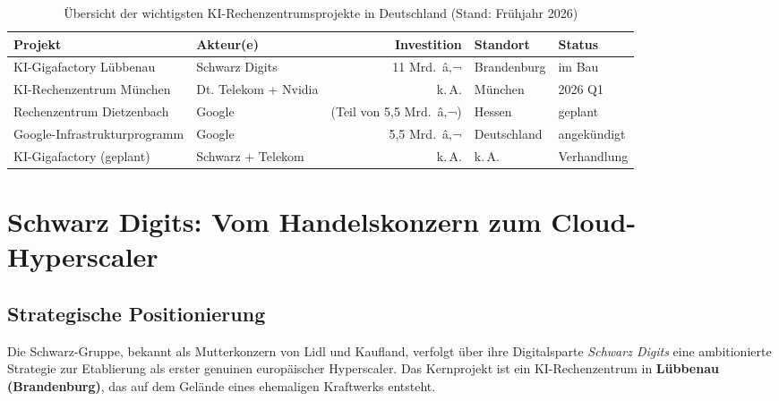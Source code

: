 ﻿\documentclass[12pt, a4paper, openany]{report}
\begin{document}
\begin{table}
	\centering
	\caption{Übersicht der wichtigsten KI-Rechenzentrumsprojekte in Deutschland (Stand: Frühjahr 2026)}
	\label{tab:rechenzentren_projekte}
	\begin{tabularx}{\textwidth}{l l r l l}
		\toprule
		\textbf{Projekt} & \textbf{Akteur(e)} & \textbf{Investition} & \textbf{Standort} & \textbf{Status} \\
		\midrule
		KI-Gigafactory Lübbenau & Schwarz Digits & 11 Mrd.\ â‚¬ & Brandenburg & im Bau \\
		KI-Rechenzentrum München & Dt. Telekom + Nvidia & k.\,A. & München & 2026 Q1 \\
		Rechenzentrum Dietzenbach & Google & (Teil von 5,5 Mrd.\ â‚¬) & Hessen & geplant \\
		Google-Infrastrukturprogramm & Google & 5,5 Mrd.\ â‚¬ & Deutschland & angekündigt \\
		KI-Gigafactory (geplant) & Schwarz + Telekom & k.\,A. & k.\,A. & Verhandlung \\
		\bottomrule
	\end{tabularx}
\end{table}

\section{Schwarz Digits: Vom Handelskonzern zum Cloud-Hyperscaler}
\label{sec:schwarz_digits}

\subsection{Strategische Positionierung}

Die Schwarz-Gruppe, bekannt als Mutterkonzern von Lidl und Kaufland, verfolgt
über ihre Digitalsparte \textit{Schwarz Digits} eine ambitionierte Strategie
zur Etablierung als erster genuinen europäischer Hyperscaler. Das Kernprojekt
ist ein KI-Rechenzentrum in \textbf{Lübbenau (Brandenburg)}, das auf dem
Gelände eines ehemaligen Kraftwerks entsteht.
\end{document}
